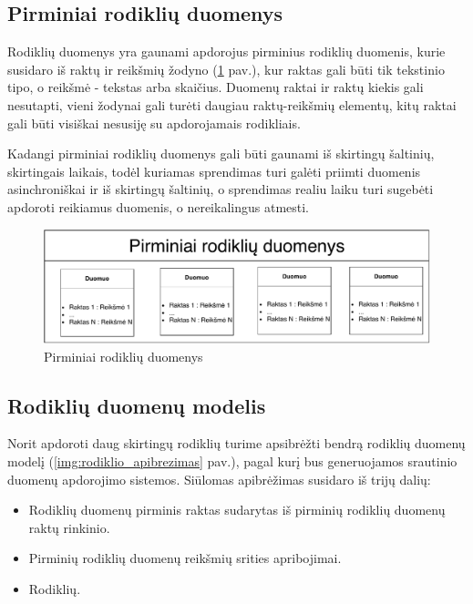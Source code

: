 \documentclass{VUMIFPSbakalaurinis}
\begin{document}
\subsection{Pirminiai rodiklių duomenys}

Rodiklių duomenys yra gaunami apdorojus pirminius rodiklių duomenis, kurie susidaro iš raktų ir reikšmių žodyno (\ref{img:duomenys} pav.), kur raktas gali būti tik tekstinio tipo, o reikšmė - tekstas arba skaičius. Duomenų raktai ir raktų kiekis gali nesutapti, vieni žodynai gali turėti daugiau raktų-reikšmių elementų, kitų raktai gali būti visiškai nesusiję su apdorojamais rodikliais. \par 
Kadangi pirminiai rodiklių duomenys gali būti gaunami iš skirtingų šaltinių, skirtingais laikais, todėl kuriamas sprendimas turi galėti priimti duomenis asinchroniškai ir iš skirtingų šaltinių, o sprendimas realiu laiku turi sugebėti apdoroti reikiamus duomenis, o nereikalingus atmesti. 

\begin{figure}[H]
    \centering
    \includegraphics[width=1\textwidth]{img/duomenys.pdf}
    \caption{Pirminiai rodiklių duomenys}
    \label{img:duomenys}
\end{figure}

\subsection{Rodiklių duomenų modelis}

Norit apdoroti daug skirtingų rodiklių turime apsibrėžti bendrą rodiklių duomenų modelį (\ref{img:rodiklio_apibrezimas} pav.), pagal kurį bus generuojamos srautinio duomenų apdorojimo sistemos. Siūlomas apibrėžimas susidaro iš trijų dalių: 
\begin{itemize}
    \item Rodiklių duomenų pirminis raktas sudarytas iš pirminių rodiklių duomenų raktų rinkinio.
    \item Pirminių rodiklių duomenų reikšmių srities apribojimai.
    \item Rodiklių. 
\end{itemize}
\end{document}
